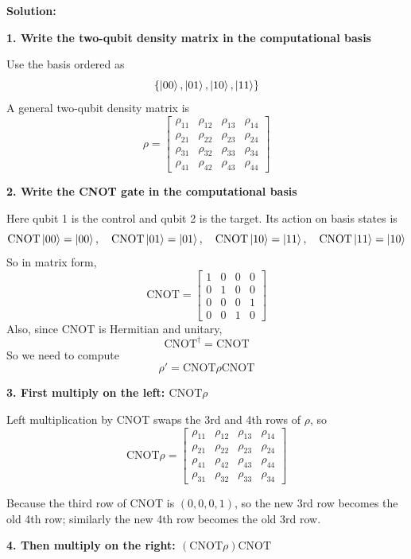 \documentclass[11pt]{article}
\newenvironment{solution}
{\par\noindent\textbf{Solution:}\par}
{\vspace{1em}}
\begin{document}
\begin{solution}
\textbf{1. Write the two-qubit density matrix in the computational basis}

Use the basis ordered as \[\{\ket{00}, \ket{01}, \ket{10}, \ket{11}\}\]
A general two-qubit density matrix is \[\rho = \begin{bmatrix}\rho_{11} & \rho_{12} & \rho_{13} & \rho_{14} \\ \rho_{21} & \rho_{22} & \rho_{23} & \rho_{24} \\ \rho_{31} & \rho_{32} & \rho_{33} & \rho_{34} \\ \rho_{41} & \rho_{42} & \rho_{43} & \rho_{44}\end{bmatrix}\]

\textbf{2. Write the CNOT gate in the computational basis}

Here qubit 1 is the control and qubit 2 is the target. Its action on basis states is \[\mathrm{CNOT}\ket{00} = \ket{00}, \quad \mathrm{CNOT}\ket{01} = \ket{01}, \quad \mathrm{CNOT}\ket{10} = \ket{11}, \quad \mathrm{CNOT}\ket{11} = \ket{10}\]
So in matrix form, \[\mathrm{CNOT} = \begin{bmatrix}1 & 0 & 0 & 0 \\ 0 & 1 & 0 & 0 \\ 0 & 0 & 0 & 1 \\ 0 & 0 & 1 & 0\end{bmatrix}\]
Also, since CNOT is Hermitian and unitary, \[\mathrm{CNOT}^\dagger = \mathrm{CNOT}\]
So we need to compute \[\rho' = \mathrm{CNOT}\rho\mathrm{CNOT}\]

\textbf{3. First multiply on the left: \(\mathrm{CNOT}\rho\)}

Left multiplication by CNOT swaps the 3rd and 4th rows of \(\rho\), so \[\mathrm{CNOT}\rho = \begin{bmatrix}\rho_{11} & \rho_{12} & \rho_{13} & \rho_{14} \\ \rho_{21} & \rho_{22} & \rho_{23} & \rho_{24} \\ \rho_{41} & \rho_{42} & \rho_{43} & \rho_{44} \\ \rho_{31} & \rho_{32} & \rho_{33} & \rho_{34}\end{bmatrix}\]

Because the third row of CNOT is \(\left(0, 0, 0, 1\right)\), so the new 3rd row becomes the old 4th row; similarly the new 4th row becomes the old 3rd row.

\textbf{4. Then multiply on the right: \(\left(\mathrm{CNOT}\rho\right)\mathrm{CNOT}\)}


\end{solution}
\end{document}

